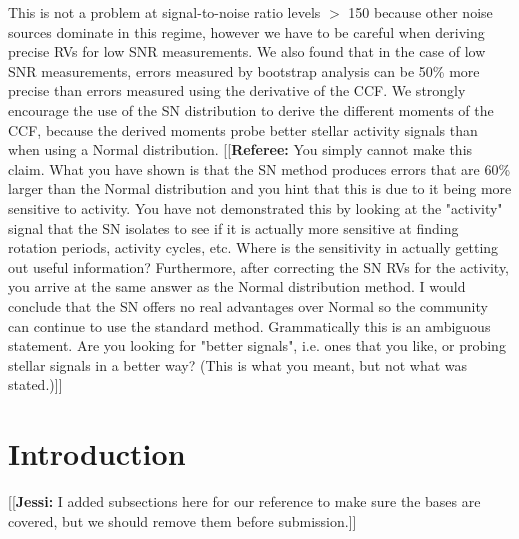 \documentclass[11pt, oneside]{article}
\newcommand{\jessi}[1]{{\color{Purple}[[\textbf{Jessi: }#1]]}}
\newcommand{\comment}[1]{{\color{red}[[\textbf{Referee: }#1]]}}
\begin{document}
This is not a problem at signal-to-noise ratio levels $>$ 150 because other noise sources dominate in this regime, however we have to be careful when deriving precise RVs for low SNR measurements. We also found that in the case of low SNR measurements, errors measured by bootstrap analysis can be 50\% more precise than errors measured using the derivative of the CCF.
We strongly encourage the use of the SN distribution to derive the different moments of the CCF, because the derived moments probe better stellar activity signals than when using a Normal distribution.
\comment{You simply cannot make this claim. What you have shown is that the SN method produces errors that are 60\% larger than the Normal distribution and you hint that this is due to it being more sensitive to activity. You have not demonstrated this by looking at the "activity" signal that the SN isolates to see if it is actually more sensitive at finding rotation periods, activity cycles, etc. Where is the sensitivity in actually getting out useful information? Furthermore, after correcting the SN RVs for the activity, you arrive at the same answer as the Normal distribution method. I would conclude that the SN offers no real advantages over Normal so the community can continue to use the standard method.
Grammatically this is an ambiguous statement. Are you looking for "better signals", i.e. ones that you like, or probing stellar signals in a better way? (This is what you meant, but not what was stated.)}


\section{Introduction}
\label{intro}
\jessi{I added subsections here for our reference to make sure the bases are covered, but we should remove them before submission.}


\end{document}
